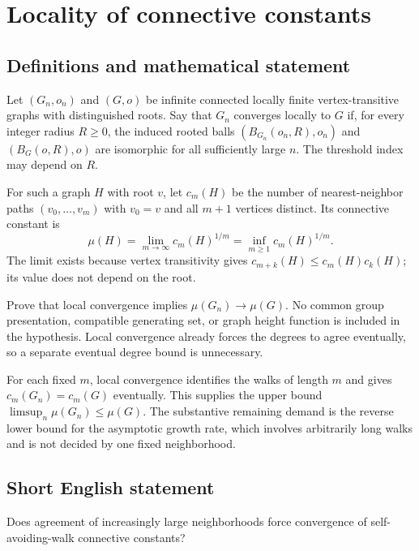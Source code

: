 \documentclass[11pt,a4paper]{article}
\begin{document}
\section*{Locality of connective constants}\label{statement}

\subsection{Definitions and mathematical statement}
Let $(G_n,o_n)$ and $(G,o)$ be infinite connected locally finite vertex-transitive graphs with distinguished roots. Say that $G_n$ converges locally to $G$ if, for every integer radius $R\ge0$, the induced rooted balls $(B_{G_n}(o_n,R),o_n)$ and $(B_G(o,R),o)$ are isomorphic for all sufficiently large $n$. The threshold index may depend on $R$.

For such a graph $H$ with root $v$, let $c_m(H)$ be the number of nearest-neighbor paths $(v_0,\ldots,v_m)$ with $v_0=v$ and all $m+1$ vertices distinct. Its connective constant is
\[
\mu(H)=\lim_{m\to\infty}c_m(H)^{1/m}
       =\inf_{m\ge1}c_m(H)^{1/m}.
\]
The limit exists because vertex transitivity gives $c_{m+k}(H)\le c_m(H)c_k(H)$; its value does not depend on the root.

Prove that local convergence implies $\mu(G_n)\to\mu(G)$. No common group presentation, compatible generating set, or graph height function is included in the hypothesis. Local convergence already forces the degrees to agree eventually, so a separate eventual degree bound is unnecessary.

For each fixed $m$, local convergence identifies the walks of length $m$ and gives $c_m(G_n)=c_m(G)$ eventually. This supplies the upper bound $\limsup_n\mu(G_n)\le\mu(G)$. The substantive remaining demand is the reverse lower bound for the asymptotic growth rate, which involves arbitrarily long walks and is not decided by one fixed neighborhood.
\subsection{Short English statement}
Does agreement of increasingly large neighborhoods force convergence of self-avoiding-walk connective constants?
\end{document}
